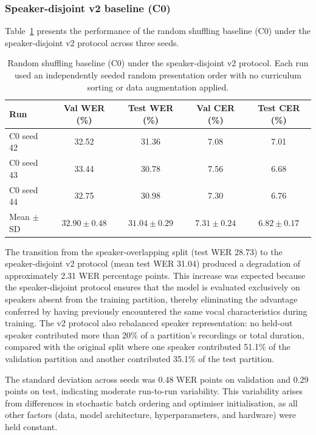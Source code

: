 \subsubsection{Speaker-disjoint v2 baseline (C0)}

Table~\ref{tab:c0-baseline} presents the performance of the random shuffling
baseline (C0) under the speaker-disjoint v2 protocol across three seeds.

\begin{table}[H]
\centering
\caption{Random shuffling baseline (C0) under the speaker-disjoint v2 protocol.
Each run used an independently seeded random presentation order with no
curriculum sorting or data augmentation applied.}
\label{tab:c0-baseline}
\begin{tabular}{lcccc}
\hline
\textbf{Run} & \textbf{Val WER (\%)} & \textbf{Test WER (\%)} & \textbf{Val CER (\%)} & \textbf{Test CER (\%)} \\
\hline
C0 seed 42 & 32.52 & 31.36 & 7.08 & 7.01 \\
C0 seed 43 & 33.44 & 30.78 & 7.56 & 6.68 \\
C0 seed 44 & 32.75 & 30.98 & 7.30 & 6.76 \\
\hline
Mean $\pm$ SD & $32.90 \pm 0.48$ & $31.04 \pm 0.29$ & $7.31 \pm 0.24$ & $6.82 \pm 0.17$ \\
\hline
\end{tabular}
\end{table}

The transition from the speaker-overlapping split (test WER 28.73) to the
speaker-disjoint v2 protocol (mean test WER 31.04) produced a degradation of
approximately 2.31 WER percentage points. This increase was expected because the
speaker-disjoint protocol ensures that the model is evaluated exclusively on
speakers absent from the training partition, thereby eliminating the advantage
conferred by having previously encountered the same vocal characteristics during
training. The v2 protocol also rebalanced speaker representation: no held-out
speaker contributed more than 20\% of a partition's recordings or total
duration, compared with the original split where one speaker contributed 51.1\%
of the validation partition and another contributed 35.1\% of the test
partition.

The standard deviation across seeds was 0.48 WER points on validation and 0.29
points on test, indicating moderate run-to-run variability. This variability
arises from differences in stochastic batch ordering and optimiser initialisation,
as all other factors (data, model architecture, hyperparameters, and hardware)
were held constant.

